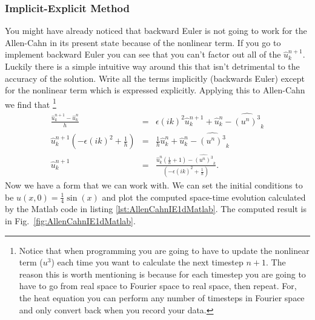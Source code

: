 \subsubsection{Implicit-Explicit Method} 
You might have already noticed that backward Euler is not going to work for the Allen-Cahn in its present state because of the nonlinear term. If you go to implement backward Euler you can see that you can't factor out all of the $\hat{u}_k^{n+1}$. Luckily there is a simple intuitive way around this that isn't detrimental to the accuracy of the solution. Write all the terms implicitly (backwards Euler) except for the nonlinear term which is expressed explicitly.  Applying this to Allen-Cahn we find that \footnote{Notice that when programming you are going to have to update the nonlinear term ($u^3$) each time you want to calculate the next timestep $n+1$. The reason this is worth mentioning is because for each timestep you are going to have to go from real space to Fourier space to real space, then repeat. For, the heat equation you can perform any number of timesteps in Fourier space and only convert back when you record your data.}
\begin{eqnarray}
\frac{\hat{u}_k^{n+1}-\hat{u}_k^n}{h} &=& \epsilon(ik)^2\hat{u}_k^{n+1}+\hat{u}_k^n-\widehat{(u^n)^3}_k \\
\hat{u}_k^{n+1}\left(-\epsilon(ik)^2+\frac{1}{h}\right)&=&\frac{1}{h}\hat{u}_k^n+\hat{u}_k^n-\widehat{(u^n)^3}_k \\
\hat{u}_k^{n+1}&=&\frac{\hat{u}_k^n(\frac{1}{h}+1)-\widehat{(u^n)^3}_k}{\left(-\epsilon(ik)^2+\frac{1}{h}\right)}. 
\end{eqnarray}
Now we have a form that we can work with. We can set the initial conditions to be $u(x,0)=\frac{1}{4} \sin(x)$ and plot the computed space-time evolution calculated by the Matlab code in listing \ref{lst:AllenCahnIE1dMatlab}. The computed result is in Fig.\ \ref{fig:AllenCahnIE1dMatlab}.



